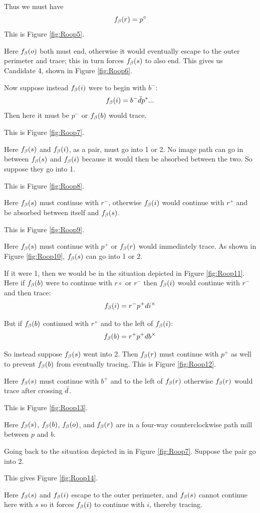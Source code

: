 Thus we must have
\[
f_\beta(r) = p^\circ
\]
This is Figure \ref{fig:Roop5}.

Here $f_\beta(o)$ both must end, otherwise it would eventually escape to the outer perimeter and trace; this in turn forces $f_\beta(s)$ to also end. This gives us Candidate 4, shown in Figure \ref{fig:Roop6}.

Now suppose instead $f_\beta(i)$ were to begin with $b^-$:
\[
f_\beta(i) = b^- \bar{d} p^*...
\]
Then here it must be $p^-$ or $f_\beta(b)$ would trace.

This is Figure \ref{fig:Roop7}.

Here $f_\beta(s)$ and $f_\beta(i)$, as a pair, must go into 1 or 2. No image path can go in between $f_\beta(s)$ and $f_\beta(i)$ because it would then be absorbed between the two. So suppose they go into 1.

This is Figure \ref{fig:Roop8}.

Here $f_\beta(s)$ must continue with $r^-$, otherwise $f_\beta(i)$ would continue with $r^+$ and be absorbed between itself and $f_\beta(s)$.

This is Figure \ref{fig:Roop9}.

Here $f_\beta(s)$ must continue with $p^+$ or $f_\beta(r)$ would immediately trace. As shown in Figure \ref{fig:Roop10}, $f_\beta(s)$ can go into 1 or 2.

If it were 1, then we would be in the situation depicted in Figure \ref{fig:Roop11}. Here if $f_\beta(b)$ were to continue with $r\circ$ or $r^-$ then $f_\beta(i)$ would continue with $r^-$ and then trace:
\[
f_\beta(i) = r^- p^+ d i^\times
\]

But if $f_\beta(b)$ continued with $r^+$ and to the left of $f_\beta(i)$:
\[
f_\beta(b) = r^+ p^+ d b^\times
\]

So instead suppose $f_\beta(s)$ went into 2. Then $f_\beta(r)$ must continue with $p^+$ as well to prevent $f_\beta(b)$ from eventually tracing. This is Figure \ref{fig:Roop12}.

Here $f_\beta(s)$ must continue with $b^+$ and to the left of $f_\beta(r)$ otherwise $f_\beta(r)$ would trace after crossing $\bar{d}$. 

This is Figure \ref{fig:Roop13}.

Here $f_\beta(s)$, $f_\beta(b)$, $f_\beta(o)$, and $f_\beta(r)$ are in a four-way counterclockwise path mill between $p$ and $b$.

Going back to the situation depicted in in Figure \ref{fig:Roop7}. Suppose the pair go into 2.

This gives Figure \ref{fig:Roop14}.

Here $f_\beta(s)$ and $f_\beta(i)$ escape to the outer perimeter, and $f_\beta(s)$ cannot continue here with $s$ so it forces $f_\beta(i)$ to continue with $i$, thereby tracing.

